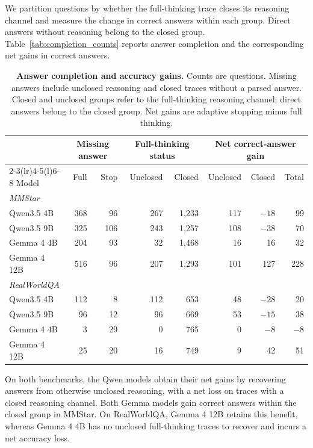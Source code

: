\documentclass{article} %
\begin{document}
We partition questions by whether the full-thinking trace closes its reasoning channel and measure the change in correct answers within each group. Direct answers without reasoning belong to the closed group. Table~\ref{tab:completion_counts} reports answer completion and the corresponding net gains in correct answers.

\begin{table}[H]
\centering\small
\renewcommand{\arraystretch}{1.05}
\setlength{\tabcolsep}{2pt}
\caption{\textbf{Answer completion and accuracy gains.} Counts are questions. Missing answers include unclosed reasoning and closed traces without a parsed answer. Closed and unclosed groups refer to the full-thinking reasoning channel; direct answers belong to the closed group. Net gains are adaptive stopping minus full thinking.}
\label{tab:completion_counts}
\label{tab:completion_gains}
\begin{tabular*}{\textwidth}{@{\extracolsep{\fill}}lrrrrrrr@{}}
\toprule
& \multicolumn{2}{c}{Missing answer} & \multicolumn{2}{c}{Full-thinking status} & \multicolumn{3}{c}{Net correct-answer gain} \\
\cmidrule(lr){2-3}\cmidrule(lr){4-5}\cmidrule(l){6-8}
Model & Full & Stop & Unclosed & Closed & Unclosed & Closed & Total \\
\midrule
\multicolumn{8}{l}{\textit{MMStar}} \\
Qwen3.5 4B & 368 & 96 & 267 & 1,233 & 117 & $-18$ & 99 \\
Qwen3.5 9B & 325 & 106 & 243 & 1,257 & 108 & $-38$ & 70 \\
Gemma 4 4B & 204 & 93 & 32 & 1,468 & 16 & 16 & 32 \\
Gemma 4 12B & 516 & 96 & 207 & 1,293 & 101 & 127 & 228 \\
\midrule
\multicolumn{8}{l}{\textit{RealWorldQA}} \\
Qwen3.5 4B & 112 & 8 & 112 & 653 & 48 & $-28$ & 20 \\
Qwen3.5 9B & 96 & 12 & 96 & 669 & 53 & $-15$ & 38 \\
Gemma 4 4B & 3 & 29 & 0 & 765 & 0 & $-8$ & $-8$ \\
Gemma 4 12B & 25 & 20 & 16 & 749 & 9 & 42 & 51 \\
\bottomrule
\end{tabular*}
\end{table}

On both benchmarks, the Qwen models obtain their net gains by recovering answers from otherwise unclosed reasoning, with a net loss on traces with a closed reasoning channel. Both Gemma models gain correct answers within the closed group in MMStar. On RealWorldQA, Gemma 4 12B retains this benefit, whereas Gemma 4 4B has no unclosed full-thinking traces to recover and incurs a net accuracy loss.
\end{document}
